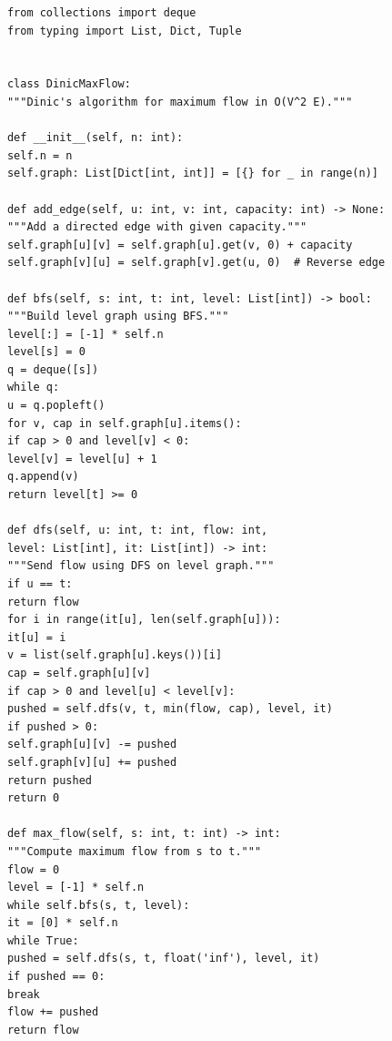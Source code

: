 \documentclass{matinbook}
\begin{document}
    \begin{latin}
        \begin{verbatim}
            from collections import deque
            from typing import List, Dict, Tuple
            
            
            class DinicMaxFlow:
            """Dinic's algorithm for maximum flow in O(V^2 E)."""
            
            def __init__(self, n: int):
            self.n = n
            self.graph: List[Dict[int, int]] = [{} for _ in range(n)]
            
            def add_edge(self, u: int, v: int, capacity: int) -> None:
            """Add a directed edge with given capacity."""
            self.graph[u][v] = self.graph[u].get(v, 0) + capacity
            self.graph[v][u] = self.graph[v].get(u, 0)  # Reverse edge
            
            def bfs(self, s: int, t: int, level: List[int]) -> bool:
            """Build level graph using BFS."""
            level[:] = [-1] * self.n
            level[s] = 0
            q = deque([s])
            while q:
            u = q.popleft()
            for v, cap in self.graph[u].items():
            if cap > 0 and level[v] < 0:
            level[v] = level[u] + 1
            q.append(v)
            return level[t] >= 0
            
            def dfs(self, u: int, t: int, flow: int,
            level: List[int], it: List[int]) -> int:
            """Send flow using DFS on level graph."""
            if u == t:
            return flow
            for i in range(it[u], len(self.graph[u])):
            it[u] = i
            v = list(self.graph[u].keys())[i]
            cap = self.graph[u][v]
            if cap > 0 and level[u] < level[v]:
            pushed = self.dfs(v, t, min(flow, cap), level, it)
            if pushed > 0:
            self.graph[u][v] -= pushed
            self.graph[v][u] += pushed
            return pushed
            return 0
            
            def max_flow(self, s: int, t: int) -> int:
            """Compute maximum flow from s to t."""
            flow = 0
            level = [-1] * self.n
            while self.bfs(s, t, level):
            it = [0] * self.n
            while True:
            pushed = self.dfs(s, t, float('inf'), level, it)
            if pushed == 0:
            break
            flow += pushed
            return flow
        \end{verbatim}
    \end{latin}
    \label{code:dinic}
    
\end{document}
